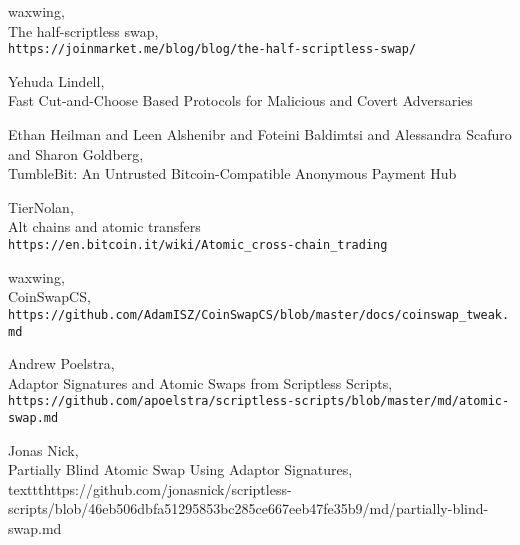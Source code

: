 \documentclass[12pt,a4paper]{article}
\begin{document}
\begin{tiny}
\begin{thebibliography}{9}
  waxwing, \\
  The half-scriptless swap, \\
  \texttt{https://joinmarket.me/blog/blog/the-half-scriptless-swap/}

  Yehuda Lindell, \\
  Fast Cut-and-Choose Based Protocols for Malicious and Covert Adversaries

  Ethan Heilman and Leen Alshenibr and Foteini Baldimtsi and Alessandra Scafuro and Sharon Goldberg, \\
  TumbleBit: An Untrusted Bitcoin-Compatible Anonymous Payment Hub

  TierNolan, \\
  Alt chains and atomic transfers \\
  \texttt{https://en.bitcoin.it/wiki/Atomic\_cross-chain\_trading}

  waxwing, \\
  CoinSwapCS, \\
  \texttt{https://github.com/AdamISZ/CoinSwapCS/blob/master/docs/coinswap\_tweak.md}

  Andrew Poelstra, \\
  Adaptor Signatures and Atomic Swaps from Scriptless Scripts, \\
  \texttt{https://github.com/apoelstra/scriptless-scripts/blob/master/md/atomic-swap.md}

  Jonas Nick, \\
  Partially Blind Atomic Swap Using Adaptor Signatures, \\
  texttt{https://github.com/jonasnick/scriptless-scripts/blob/46eb506dbfa51295853bc285ce667eeb47fe35b9/md/partially-blind-swap.md}
\end{thebibliography}
\end{tiny}
\end{document}
